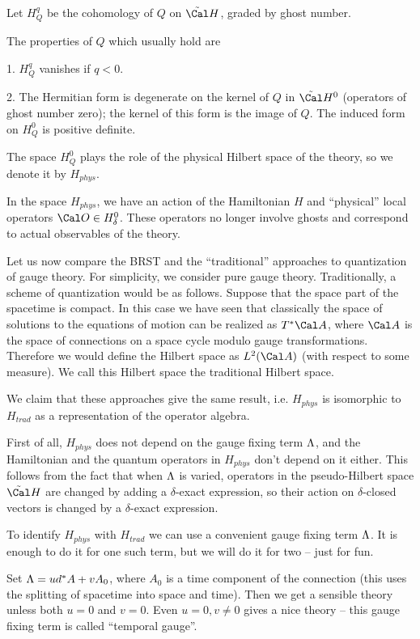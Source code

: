 Let $H_Q^q$ be the cohomology of $Q$ on $\tilde\Cal H$, graded by ghost 
number.  

The  properties of $Q$ which usually hold are 

1. $H_Q^q$ vanishes if $q<0$.   

2. The Hermitian form is degenerate on 
the kernel of $Q$ in $\tilde\Cal H^0$ (operators of ghost number zero); 
the kernel of this form is the image of $Q$. The induced 
form on $H_Q^0$ is positive definite. 
   
The space $H_Q^0$ plays the role of the physical Hilbert space 
of the theory, so we denote it by $H_{phys}$. 

In the space $H_{phys}$, we have an action of the Hamiltonian $H$ and 
``physical'' local operators $\O\in H_\delta^0$. These operators no longer 
involve ghosts and correspond to actual observables of the theory. 

Let us now compare the BRST and the ``traditional'' approaches to 
quantization of gauge theory. For simplicity, we consider pure gauge theory. 
Traditionally, a scheme of quantization 
would be as follows. Suppose that the space part of the spacetime is compact. 
In this case we have seen that classically the space of solutions 
to the equations of motion can be realized as $T^*\Cal A$, where 
$\Cal A$ is the space of connections on a space cycle
modulo gauge transformations. Therefore we 
would define the Hilbert space as $L^2(\Cal A)$ (with respect 
to some measure). We call this Hilbert space 
the traditional Hilbert space. 

We claim that these approaches give the same result, i.e. $H_{phys}$ 
is isomorphic to $H_{trad}$ as a representation of the operator algebra. 

First of all, $H_{phys}$ does not depend on the gauge fixing term 
$\Lambda$, and the Hamiltonian and the quantum operators in $H_{phys}$ don't 
depend on it either. This follows from the fact that when $\Lambda$ is varied, 
operators in the pseudo-Hilbert space $\tilde\Cal H$ are changed 
by adding a $\delta$-exact expression, so their action on $\delta$-closed 
vectors is changed by a $\delta$-exact expression. 

To identify $H_{phys}$ with $H_{trad}$ we can use a convenient 
gauge fixing term $\Lambda$. It is enough to do it for one such term, but 
we will do it for two -- just for fun. 

Set $\Lambda=ud^*A+vA_0$, where $A_0$ is a time component 
of the connection (this uses the splitting 
of spacetime into space and time). Then we get a sensible  
theory unless both $u=0$ and $v=0$. Even $u=0,v\ne 0$ gives a nice theory -- 
this gauge fixing term is called ``temporal gauge''.

